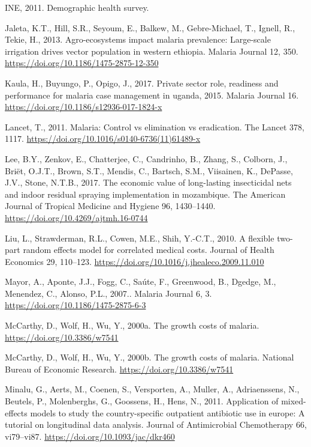 \documentclass[]{article}
\begin{document}
\hypertarget{ref-estatistica2009}{}
INE, 2011. Demographic health survey.

\hypertarget{ref-Jaleta2013}{}
Jaleta, K.T., Hill, S.R., Seyoum, E., Balkew, M., Gebre-Michael, T.,
Ignell, R., Tekie, H., 2013. Agro-ecosystems impact malaria prevalence:
Large-scale irrigation drives vector population in western ethiopia.
Malaria Journal 12, 350. \url{https://doi.org/10.1186/1475-2875-12-350}

\hypertarget{ref-Kaula_2017}{}
Kaula, H., Buyungo, P., Opigo, J., 2017. Private sector role, readiness
and performance for malaria case management in uganda, 2015. Malaria
Journal 16. \url{https://doi.org/10.1186/s12936-017-1824-x}

\hypertarget{ref-TheLancet2011}{}
Lancet, T., 2011. Malaria: Control vs elimination vs eradication. The
Lancet 378, 1117. \url{https://doi.org/10.1016/s0140-6736(11)61489-x}

\hypertarget{ref-Lee2017}{}
Lee, B.Y., Zenkov, E., Chatterjee, C., Candrinho, B., Zhang, S.,
Colborn, J., Briët, O.J.T., Brown, S.T., Mendis, C., Bartsch, S.M.,
Viisainen, K., DePasse, J.V., Stone, N.T.B., 2017. The economic value of
long-lasting insecticidal nets and indoor residual spraying
implementation in mozambique. The American Journal of Tropical Medicine
and Hygiene 96, 1430--1440. \url{https://doi.org/10.4269/ajtmh.16-0744}

\hypertarget{ref-Liu2010}{}
Liu, L., Strawderman, R.L., Cowen, M.E., Shih, Y.-C.T., 2010. A flexible
two-part random effects model for correlated medical costs. Journal of
Health Economics 29, 110--123.
\url{https://doi.org/10.1016/j.jhealeco.2009.11.010}

\hypertarget{ref-Mayor2007}{}
Mayor, A., Aponte, J.J., Fogg, C., Saúte, F., Greenwood, B., Dgedge, M.,
Menendez, C., Alonso, P.L., 2007.. Malaria Journal 6, 3.
\url{https://doi.org/10.1186/1475-2875-6-3}

\hypertarget{ref-McCarthy_2000}{}
McCarthy, D., Wolf, H., Wu, Y., 2000a. The growth costs of malaria.
\url{https://doi.org/10.3386/w7541}

\hypertarget{ref-McCarthy2000}{}
McCarthy, D., Wolf, H., Wu, Y., 2000b. The growth costs of malaria.
National Bureau of Economic Research.
\url{https://doi.org/10.3386/w7541}

\hypertarget{ref-Minalu2011}{}
Minalu, G., Aerts, M., Coenen, S., Versporten, A., Muller, A.,
Adriaenssens, N., Beutels, P., Molenberghs, G., Goossens, H., Hens, N.,
2011. Application of mixed-effects models to study the country-specific
outpatient antibiotic use in europe: A tutorial on longitudinal data
analysis. Journal of Antimicrobial Chemotherapy 66, vi79--vi87.
\url{https://doi.org/10.1093/jac/dkr460}
\end{document}
